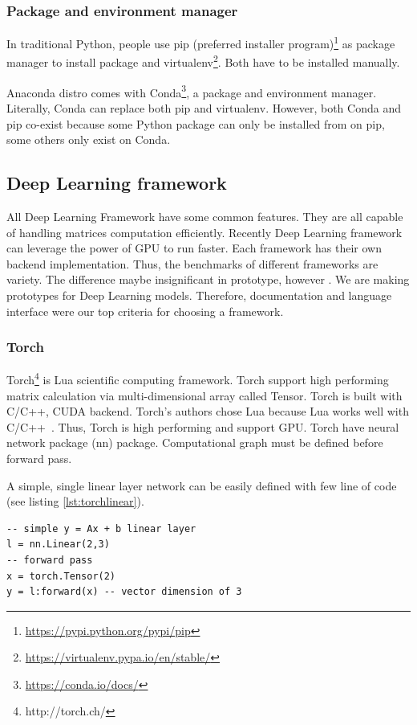 \subsubsection{Package and environment manager}
In traditional Python, people use pip (preferred installer program)\footnote{\url{https://pypi.python.org/pypi/pip}} as package manager to install package and virtualenv\footnote{\url{https://virtualenv.pypa.io/en/stable/}}. Both have to be installed manually.

Anaconda distro comes with Conda\footnote{\url{https://conda.io/docs/}}, a package and environment manager.
Literally, Conda can replace both pip and virtualenv.
However, both Conda and pip co-exist because some Python package can only be installed from on pip, some others only exist on Conda.


\subsection{Deep Learning framework}
All Deep Learning Framework have some common features.
They are all capable of handling matrices computation efficiently.
Recently Deep Learning framework can leverage the power of GPU to run faster.
Each framework has their own backend implementation.
Thus, the benchmarks of different frameworks are variety.
The difference maybe insignificant in prototype, however .
We are making prototypes for Deep Learning models.
Therefore, documentation and language interface were our top criteria for choosing a framework.

\subsubsection{Torch}\label{sec:torch}
Torch\footnote{http://torch.ch/} is Lua scientific computing framework.
Torch support high performing matrix calculation via multi-dimensional array called Tensor. Torch is built with C/C++, CUDA backend.
Torch's authors chose Lua because Lua works well with C/C++~\cite{collobert2011torch7}.  Thus, Torch is high performing and support GPU. Torch have neural network package (nn) package. Computational graph must be defined before forward pass.

A simple, single linear layer network can be easily defined with few line of code (see listing \ref{lst:torchlinear}).

\begin{lstlisting}[caption={Simple linear layer in Torch},label={lst:torchlinear}, language={[5.1]Lua}]
-- simple y = Ax + b linear layer
l = nn.Linear(2,3)
-- forward pass
x = torch.Tensor(2)
y = l:forward(x) -- vector dimension of 3
\end{lstlisting}

